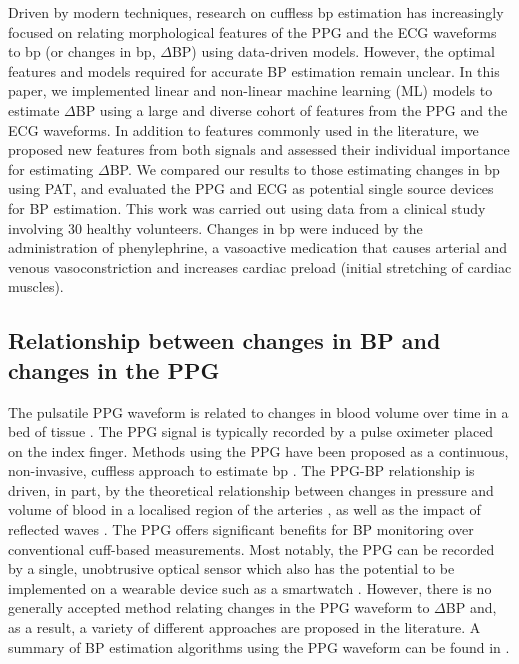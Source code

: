 \documentclass[fleqn,10pt]{wlscirep}
\begin{document}
Driven by modern techniques, research on cuffless \ac{bp} estimation has increasingly focused on relating morphological features of the PPG and the ECG waveforms to \ac{bp} (or changes in \ac{bp}, $\Delta$BP) using data-driven models. However, the optimal features and models required for accurate BP estimation remain unclear. In this paper, we implemented linear and non-linear machine learning (ML) models to estimate $\Delta$BP using a large and diverse cohort of features from the PPG and the ECG waveforms. In addition to features commonly used in the literature, we proposed new features from both signals and assessed their individual importance for estimating $\Delta$BP. We compared our results to those estimating changes in \ac{bp} using PAT, and evaluated the PPG and ECG as potential single source devices for BP estimation. This work was carried out using data from a clinical study involving 30 healthy volunteers. Changes in \ac{bp} were induced by the administration of phenylephrine, a vasoactive medication that causes arterial and venous vasoconstriction and increases cardiac preload (initial stretching of cardiac muscles). 

\subsection{Relationship between changes in BP and changes in the PPG}

The pulsatile PPG waveform is related to changes in blood volume over time in a bed of tissue \cite{allen2007photoplethysmography}. The PPG signal is typically recorded by a pulse oximeter placed on the index finger. Methods using the PPG have been proposed as a continuous, non-invasive, cuffless approach to estimate \ac{bp} \cite{Mukkamala2022}. The PPG-BP relationship is driven, in part, by the theoretical relationship between changes in pressure and volume of blood in a localised region of the arteries \cite{Mukkamala2022}, as well as the impact of reflected waves \cite{Baruch2011}. The PPG offers significant benefits for BP monitoring over conventional cuff-based measurements. Most notably, the PPG can be recorded by a single, unobtrusive optical sensor which also has the potential to be implemented on a wearable device such as a smartwatch \cite{Vybornova2021, Radha2019}. However, there is no generally accepted method relating changes in the PPG waveform to $\Delta$BP and, as a result, a variety of different approaches are proposed in the literature. A summary of BP estimation algorithms using the PPG waveform can be found in \cite{Hosanee2020, Elgendi2019, Mukkamala2022}.
\end{document}

